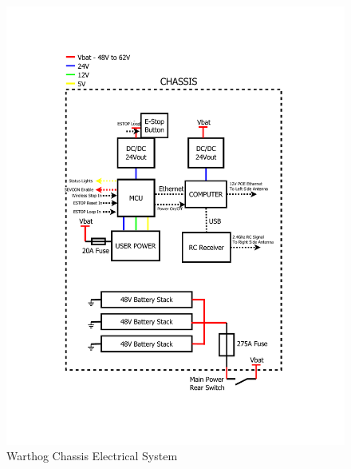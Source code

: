 \documentclass[]{clearpath-latex/clearpath-manual}
\begin{document}
\begin{figure}[!h]
  \centering
  \includegraphics[width=1.0\linewidth]{elec-chassis.pdf}
  \caption{Warthog Chassis Electrical System}
  \label{elec-chassis}
\end{figure}
\end{document}
